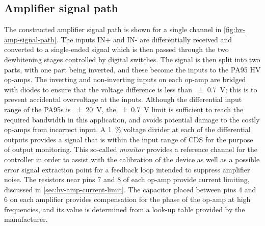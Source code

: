 \subsection{Amplifier signal path}
The constructed amplifier signal path is shown for a single channel in \cref{fig:hv-amp-signal-path}. The inputs IN+ and IN- are differentially received and converted to a single-ended signal which is then passed through the two dewhitening stages controlled by digital switches. The signal is then split into two parts, with one part being inverted, and these become the inputs to the PA95 \gls{HV} op-amps. The inverting and non-inverting inputs on each op-amp are bridged with diodes to ensure that the voltage difference is less than \SI{\pm0.7}{\volt}; this is to prevent accidental overvoltage at the inputs. Although the differential input range of the PA95s is \SI{\pm20}{\volt}, the \SI{\pm0.7}{\volt} limit is sufficient to reach the required bandwidth in this application, and avoids potential damage to the costly op-amps from incorrect input. A \SI{1}{\percent} voltage divider at each of the differential outputs provides a signal that is within the input range of \gls{CDS} for the purpose of output monitoring. This so-called \emph{monitor} provides a reference channel for the controller in order to assist with the calibration of the device as well as a possible error signal extraction point for a feedback loop intended to suppress amplifier noise. The resistors near pins 7 and 8 of each op-amp provide current limiting, discussed in \cref{sec:hv-amp-current-limit}. The capacitor placed between pins 4 and 6 on each amplifier provides compensation for the phase of the op-amp at high frequencies, and its value is determined from a look-up table provided by the manufacturer.

